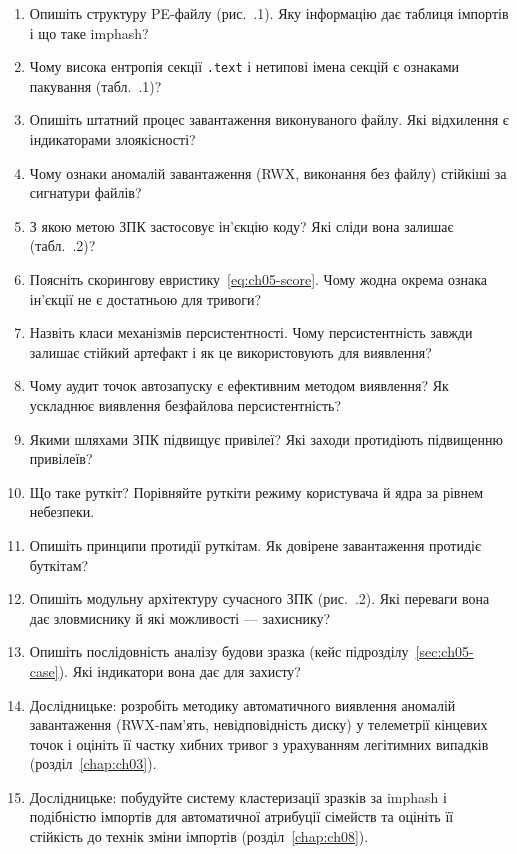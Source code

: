 \selfcheck
\begin{enumerate}
\item Опишіть структуру PE-файлу (рис.~\thechapter.1). Яку інформацію дає таблиця імпортів і що таке imphash?
\item Чому висока ентропія секції \texttt{.text} і нетипові імена секцій є ознаками пакування (табл.~\thechapter.1)?
\item Опишіть штатний процес завантаження виконуваного файлу. Які відхилення є індикаторами злоякісності?
\item Чому ознаки аномалій завантаження (RWX, виконання без файлу) стійкіші за сигнатури файлів?
\item З якою метою ЗПК застосовує ін'єкцію коду? Які сліди вона залишає (табл.~\thechapter.2)?
\item Поясніть скорингову евристику~\eqref{eq:ch05-score}. Чому жодна окрема ознака ін'єкції не є достатньою для тривоги?
\item Назвіть класи механізмів персистентності. Чому персистентність завжди залишає стійкий артефакт і як це використовують для виявлення?
\item Чому аудит точок автозапуску є ефективним методом виявлення? Як ускладнює виявлення безфайлова персистентність?
\item Якими шляхами ЗПК підвищує привілеї? Які заходи протидіють підвищенню привілеїв?
\item Що таке руткіт? Порівняйте руткіти режиму користувача й ядра за рівнем небезпеки.
\item Опишіть принципи протидії руткітам. Як довірене завантаження протидіє буткітам?
\item Опишіть модульну архітектуру сучасного ЗПК (рис.~\thechapter.2). Які переваги вона дає зловмиснику й які можливості --- захиснику?
\item Опишіть послідовність аналізу будови зразка (кейс підрозділу~\ref{sec:ch05-case}). Які індикатори вона дає для захисту?
\item Дослідницьке: розробіть методику автоматичного виявлення аномалій завантаження (RWX-пам'ять, невідповідність диску) у телеметрії кінцевих точок і оцініть її частку хибних тривог з урахуванням легітимних випадків (розділ~\ref{chap:ch03}).
\item Дослідницьке: побудуйте систему кластеризації зразків за imphash і подібністю імпортів для автоматичної атрибуції сімейств та оцініть її стійкість до технік зміни імпортів (розділ~\ref{chap:ch08}).
\end{enumerate}
